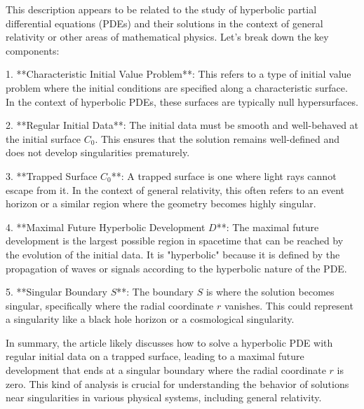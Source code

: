 This description appears to be related to the study of hyperbolic partial differential equations (PDEs) and their solutions in the context of general relativity or other areas of mathematical physics. Let's break down the key components:

1. **Characteristic Initial Value Problem**: This refers to a type of initial value problem where the initial conditions are specified along a characteristic surface. In the context of hyperbolic PDEs, these surfaces are typically null hypersurfaces.

2. **Regular Initial Data**: The initial data must be smooth and well-behaved at the initial surface \(C_0\). This ensures that the solution remains well-defined and does not develop singularities prematurely.

3. **Trapped Surface \(C_0\)**: A trapped surface is one where light rays cannot escape from it. In the context of general relativity, this often refers to an event horizon or a similar region where the geometry becomes highly singular.

4. **Maximal Future Hyperbolic Development \(D\)**: The maximal future development is the largest possible region in spacetime that can be reached by the evolution of the initial data. It is "hyperbolic" because it is defined by the propagation of waves or signals according to the hyperbolic nature of the PDE.

5. **Singular Boundary \(S\)**: The boundary \(S\) is where the solution becomes singular, specifically where the radial coordinate \(r\) vanishes. This could represent a singularity like a black hole horizon or a cosmological singularity.

In summary, the article likely discusses how to solve a hyperbolic PDE with regular initial data on a trapped surface, leading to a maximal future development that ends at a singular boundary where the radial coordinate \(r\) is zero. This kind of analysis is crucial for understanding the behavior of solutions near singularities in various physical systems, including general relativity.